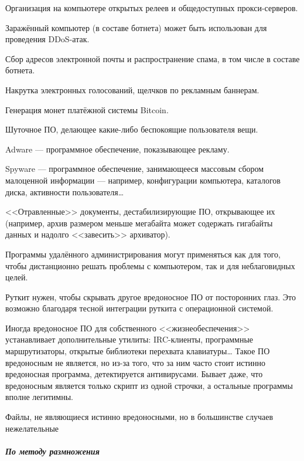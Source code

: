 \begin{Notes}
  \item Организация на компьютере открытых релеев и общедоступных прокси-серверов.
  \item Заражённый компьютер (в составе ботнета) может быть использован для проведения DDoS-атак.
  \item Сбор адресов электронной почты и распространение спама, в том числе в составе ботнета.
  \item Накрутка электронных голосований, щелчков по рекламным баннерам.
  \item Генерация монет платёжной системы Bitcoin.
  \item Шуточное ПО, делающее какие-либо беспокоящие пользователя вещи.
  \item Adware — программное обеспечение, показывающее рекламу.
  \item Spyware — программное обеспечение, занимающееся массовым сбором малоценной информации — например, конфигурации компьютера, каталогов диска, активности пользователя…
  \item <<Отравленные>> документы, дестабилизирующие ПО, открывающее их (например, архив размером меньше мегабайта может содержать гигабайты данных и надолго <<завесить>> архиватор).
  \item Программы удалённого администрирования могут применяться как для того, чтобы дистанционно решать проблемы с компьютером, так и для неблаговидных целей.
  \item Руткит нужен, чтобы скрывать другое вредоносное ПО от посторонних глаз. Это возможно благодаря тесной интеграции руткита с операционной системой.
  \item Иногда вредоносное ПО для собственного <<жизнеобеспечения>> устанавливает дополнительные утилиты: IRC-клиенты, программные маршрутизаторы, открытые библиотеки перехвата клавиатуры… Такое ПО вредоносным не является, но из-за того, что за ним часто стоит истинно вредоносная программа, детектируется антивирусами. Бывает даже, что вредоносным является только скрипт из одной строчки, а остальные программы вполне легитимны.
  \item Файлы, не являющиеся истинно вредоносными, но в большинстве случаев нежелательные
\end{Notes}
%
\subparagraph{По методу размножения}
%
